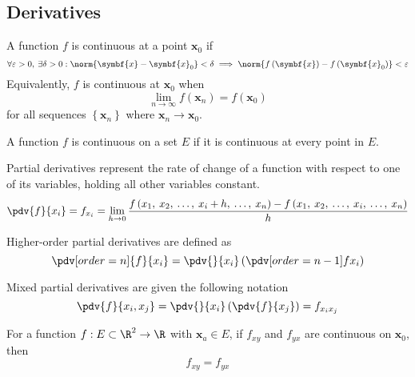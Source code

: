 \documentclass{article}
\begin{document}
\subsection{Derivatives}
\begin{definition}[Continuity]
    A function \(f\) is continuous at a point \(\symbf{x}_0\) if
    \begin{equation*}
        \forall \varepsilon > 0,\: \exists \delta > 0 : \norm{\symbf{x} - \symbf{x}_0} < \delta \implies \norm{f\left( \symbf{x} \right) - f\left( \symbf{x}_0 \right)} < \varepsilon
    \end{equation*}
    Equivalently, \(f\) is continuous at \(\symbf{x}_0\) when
    \begin{equation*}
        \lim_{n \to \infty} f\left( \symbf{x}_n \right) = f\left( \symbf{x}_0 \right)
    \end{equation*}
    for all sequences \(\left\{ \symbf{x}_n \right\} \) where \(\symbf{x}_n \to \symbf{x}_0\).

    A function \(f\) is continuous on a set \(E\) if it is continuous
    at every point in \(E\).
\end{definition}
\begin{definition}
    Partial derivatives represent the rate of change of a function with respect to one of its variables, holding all other variables constant.
    \begin{equation*}
        \pdv{f}{x_i} = f_{x_i} = \lim_{h \to 0} \frac{f\left( x_1,\: x_2,\: \ldots,\: x_i + h,\: \ldots,\: x_n \right) - f\left( x_1,\: x_2,\: \ldots,\: x_i,\: \ldots,\: x_n \right)}{h}
    \end{equation*}
\end{definition}
\begin{definition}
    Higher-order partial derivatives are defined as
    \begin{equation*}
        \pdv[order=n]{f}{x_i} = \pdv{}{x_i} \left( \pdv[order={n - 1}]{f}{x_i} \right)
    \end{equation*}
\end{definition}
\begin{definition}
    Mixed partial derivatives are given the following notation
    \begin{equation*}
        \pdv{f}{x_i,x_j} = \pdv{}{x_i} \left( \pdv{f}{x_j} \right) = f_{x_i x_j}
    \end{equation*}
\end{definition}
\begin{theorem}
    For a function \(f : E \subset \R^2 \to \R\) with \(\symbf{x}_a \in E\), if \(f_{xy}\) and \(f_{yx}\) are continuous on \(\symbf{x}_0\), then
    \begin{equation*}
        f_{xy} = f_{yx}
    \end{equation*}
\end{theorem}
\end{document}
